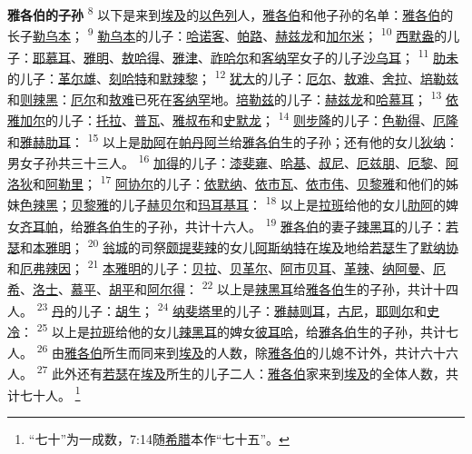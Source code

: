 \textbf{雅各伯的子孙\quad}
\textsuperscript{8}
以下是来到\uline{埃及}的\uline{以色列}人，\uline{雅各伯}和他子孙的名单：\uline{雅各伯}的长子\uline{勒乌本}；
\textsuperscript{9}
\uline{勒乌本}的儿子：\uline{哈诺客}、\uline{帕路}、\uline{赫兹龙}和\uline{加尔米}；
\textsuperscript{10}
\uline{西默盎}的儿子：\uline{耶慕耳}、\uline{雅明}、\uline{敖哈得}、\uline{雅津}、\uline{祚哈尔}和\uline{客纳罕}女子的儿子\uline{沙乌耳}；
\textsuperscript{11}
\uline{肋未}的儿子：\uline{革尔雄}、\uline{刻哈特}和\uline{默辣黎}；
\textsuperscript{12}
\uline{犹大}的儿子：\uline{厄尔}、\uline{敖难}、\uline{舍拉}、\uline{培勒兹}和\uline{则辣黑}：\uline{厄尔}和\uline{敖难}已死在\uline{客纳罕}地。\uline{培勒兹}的儿子：\uline{赫兹龙}和\uline{哈慕耳}；
\textsuperscript{13}
\uline{依雅}\uline{加尔}的儿子：\uline{托拉}、\uline{普瓦}、\uline{雅叔布}和\uline{史默龙}；
\textsuperscript{14}
\uline{则步隆}的儿子：\uline{色勒得}、\uline{厄隆}和\uline{雅赫肋耳}：
\textsuperscript{15}
以上是\uline{肋阿}在\uline{帕丹}\uline{阿兰}给\uline{雅各伯}生的子孙；还有他的女儿\uline{狄纳}：男女子孙共三十三人。
\textsuperscript{16}
\uline{加得}的儿子：\uline{漆斐雍}、\uline{哈基}、\uline{叔尼}、\uline{厄兹朋}、\uline{厄黎}、\uline{阿洛狄}和\uline{阿勒里}；
\textsuperscript{17}
\uline{阿协尔}的儿子：\uline{依默纳}、\uline{依市瓦}、\uline{依市伟}、\uline{贝黎雅}和他们的姊妹\uline{色辣黑}；\uline{贝黎雅}的儿子\uline{赫贝尔}和\uline{玛耳基耳}：
\textsuperscript{18}
以上是\uline{拉班}给他的女儿\uline{肋阿}的婢女\uline{齐耳帕}，给\uline{雅各伯}生的子孙，共计十六人。
\textsuperscript{19}
\uline{雅各伯}的妻子\uline{辣黑耳}的儿子：\uline{若瑟}和\uline{本雅明}；
\textsuperscript{20}
\uline{翁城}的司祭\uline{颇提斐辣}的女儿\uline{阿斯}\uline{纳特}在\uline{埃及}地给\uline{若瑟}生了\uline{默纳协}和\uline{厄弗辣因}；
\textsuperscript{21}
\uline{本雅明}的儿子：\uline{贝拉}、\uline{贝革尔}、\uline{阿市贝耳}、\uline{革辣}、\uline{纳阿曼}、\uline{厄希}、\uline{洛士}、\uline{慕平}、\uline{胡平}和\uline{阿尔得}：
\textsuperscript{22}
以上是\uline{辣黑耳}给\uline{雅各伯}生的子孙，共计十四人。
\textsuperscript{23}
\uline{丹}的儿子：\uline{胡生}；
\textsuperscript{24}
\uline{纳斐塔里}的儿子：\uline{雅赫则耳}，\uline{古尼}，\uline{耶则尔}和\uline{史冷}：
\textsuperscript{25}
以上是\uline{拉班}给他的女儿\uline{辣黑耳}的婢女\uline{彼耳哈}，给\uline{雅各伯}生的子孙，共计七人。
\textsuperscript{26}
由\uline{雅各伯}所生而同来到\uline{埃及}的人数，除\uline{雅各伯}的儿媳不计外，共计六十六人。
\textsuperscript{27}
此外还有\uline{若瑟}在\uline{埃及}所生的儿子二人：\uline{雅各伯}家来到\uline{埃及}的全体人数，共计七十人。
\footnote{“七十”为一成数，7:14随\uline{希腊}本作“七十五”。}


